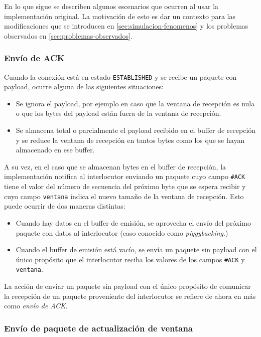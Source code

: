 \documentclass[a4paper, 10pt, twoside]{article}
\newcommand{\established}{\texttt{ESTABLISHED}\xspace}
\newcommand{\ack}{\texttt{\#ACK}\xspace}
\newcommand{\window}{\texttt{ventana}\xspace}
\begin{document}
En lo que sigue se describen algunos escenarios que ocurren al usar la implementación original. La motivación de esto es dar un contexto para las modificaciones que se introducen en \ref{sec:simulacion-fenomenos} y los problemas observados en \ref{sec:problemas-observados}.


\subsubsection{Envío de ACK}

Cuando la conexión está en estado \established y se recibe un paquete con payload, ocurre alguna de las siguientes situaciones:

\begin{itemize}
  \item Se ignora el payload, por ejemplo en caso que la ventana de recepción es nula o que los bytes del payload están fuera de la ventana de recepción.

  \item Se almacena total o parcialmente el payload recibido en el buffer de recepción y se reduce la ventana de recepción en tantos bytes como los que se hayan almacenado en ese buffer.
\end{itemize}

A su vez, en el caso que se almacenan bytes en el buffer de recepción, la implementación notifica al interlocutor enviando un paquete cuyo campo \ack tiene el valor del número de secuencia del próximo byte que se espera recibir y cuyo campo \window indica el nuevo tamaño de la ventana de recepción. Esto puede ocurrir de dos maneras distintas:

\begin{itemize}
  \item Cuando hay datos en el buffer de emisión, se aprovecha el envío del próximo paquete con datos al interlocutor (caso conocido como \emph{piggybacking}.)

  \item Cuando el buffer de emisión está vacío, se envía un paquete sin payload con el único propósito que el interlocutor reciba los valores de los campos \ack y \window.
\end{itemize}

La acción de enviar un paquete sin payload con el único propósito de comunicar la recepción de un paquete proveniente del interlocutor se refiere de ahora en más como \emph{envío de ACK}.


\subsubsection{Envío de paquete de actualización de ventana}
\label{sec:envio-paquete-ventana}
\end{document}

